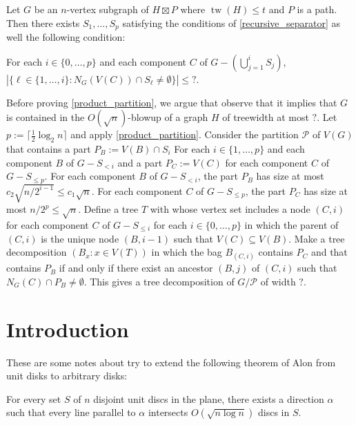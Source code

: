 \documentclass{patmorin}
\renewcommand{\le}{\leqslant}
\DeclareMathOperator{\tw}{tw}
\begin{document}
\begin{lem}\label{product_partition}
  Let $G$ be an $n$-vertex subgraph of $H\boxtimes P$ where $\tw(H)\le t$ and $P$ is a path.  Then there exists $S_1,\ldots,S_p$ satisfying the conditions of \cref{recursive_separator} as well the following condition:
  \begin{compactenum}[(a)]\setcounter{enumi}{4}
    \item For each $i\in\{0,\ldots,p\}$ and each component $C$ of $G-(\bigcup_{j=1}^i S_j)$, $|\{\ell\in\{1,\ldots,i\}:N_G(V(C))\cap S_\ell\neq\emptyset\}|\le ?$.
  \end{compactenum}
\end{lem}

Before proving \cref{product_partition}, we argue that observe that it implies that $G$ is contained in the $O(\sqrt{n})$-blowup of a graph $H$ of treewidth at most $?$. Let $p:=\lceil \tfrac12\log_2 n\rceil$ and apply \cref{product_partition}.  Consider the partition $\mathcal{P}$ of $V(G)$ that contains a part $P_B:=V(B)\cap S_i$ For each $i\in\{1,\ldots,p\}$ and each component $B$ of $G-S_{<i}$ and a part $P_C:=V(C)$ for each component $C$ of $G-S_{\le p}$.
For each component $B$ of $G-S_{<i}$, the part $P_{B}$ has size at most $c_2\sqrt{n/2^{i-1}}\le c_1\sqrt{n}$.  For each component $C$ of $G-S_{\le p}$, the part $P_C$ has size at most $n/2^p \le \sqrt{n}$.  Define a tree $T$ with whose vertex set includes a node $(C,i)$ for each component $C$ of $G-S_{\le i}$ for each $i\in\{0,\ldots,p\}$ in which the parent of $(C,i)$ is the unique node $(B,i-1)$ such that $V(C)\subseteq V(B)$.
Make a tree decomposition $(B_x:x\in V(T))$ in which the bag $B_{(C,i)}$ contains $P_C$ and that contains $P_B$ if and only if there exist an ancestor $(B,j)$ of $(C,i)$ such that $N_G(C)\cap P_B\neq\emptyset$.  This gives a tree decomposition of $G/\mathcal{P}$ of width $?$.





\section{Introduction}

These are some notes about try to extend the following theorem of Alon from unit disks to arbitrary disks:

\begin{thm}[Alon]\label{alon}
  For every set $S$ of $n$ disjoint unit discs in the plane, there exists a direction $\alpha$ such that every line parallel to $\alpha$ intersects $O(\sqrt{n\log n})$ discs in $S$.
\end{thm}
\end{document}
